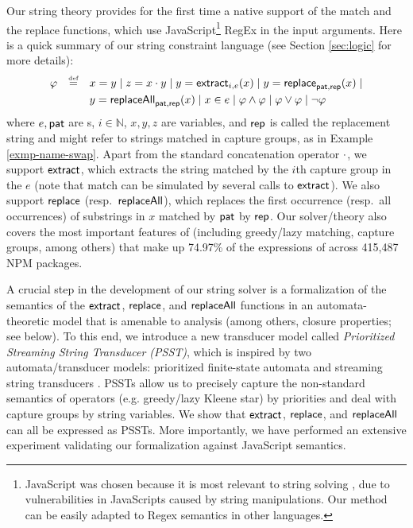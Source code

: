 Our string theory provides for the first time a native support of the match and the 
replace functions, which use JavaScript\footnote{JavaScript was chosen 
because it is most relevant to string solving 
\cite{BEK,Berkeley-JavaScript}, due to vulnerabilities in JavaScripts 
caused by string manipulations. Our method can be easily adapted to Regex
semantics in other languages.} RegEx in the input arguments. Here is a quick
summary of our string constraint language (see Section \ref{sec:logic} for
more details):
\[
\begin{array}{l c l}
\smallskip
\varphi & \eqdef  & x = y \mid z = x \concat y \mid y  = \extract_{i, e}(x) \mid
y  = \replace_{\pat, \rep}(x) \mid 
\\
& & y = \replaceall_{\pat, \rep}(x)   \mid
 x \in e \mid \varphi \wedge \varphi \mid \varphi \vee \varphi \mid \neg \varphi \
\label{eq:SL}
\end{array}
\]
where $e, \mathsf{pat}$ are \regexp{}s, $i \in \mathbb{N}$, $x,y,z$ are variables, and $\mathsf{rep}$ 
is called the
replacement string and might refer to strings matched in capture groups,
as in Example \ref{exmp-name-swap}. Apart from the standard concatenation
operator $\cdot$, we support $\mathsf{extract}$, which extracts the string matched by
the $i$th capture group in the \regexp{} $e$ (note that match can be simulated
by several calls to $\mathsf{extract}$). We also support $\mathsf{replace}$ 
(resp.~$\mathsf{replaceAll}$), which replaces the first occurrence (resp.~all
occurrences) of substrings in $x$ matched by $\mathsf{pat}$ by $\mathsf{rep}$. Our solver/theory
also covers the most important features of \regexp{} (including greedy/lazy
matching, capture groups, among others) that make up 74.97\% of the \regexp{}
expressions of \cite{LMK19} across 415,487 NPM packages. 

A crucial step in the development of our string solver is a formalization of
the semantics of the $\mathsf{extract}$, $\mathsf{replace}$, and $\mathsf{replaceAll}$ functions in
an automata-theoretic model that is amenable to analysis (among others, closure
properties; see below).
%
To this end, we introduce a new 
transducer model called \emph{Prioritized Streaming String Transducer (PSST)},
which is inspired by %
two automata/transducer models: prioritized finite-state automata \cite{BM17} 
and streaming string transducers \cite{AC10,AD11}. PSSTs allow us to precisely
capture the non-standard semantics of \regexp{} operators (e.g. greedy/lazy Kleene star) by priorities and 
deal with capture groups by string variables. 
We show that $\mathsf{extract}$, $\mathsf{replace}$, and $\mathsf{replaceAll}$ can all be expressed as 
PSSTs. More importantly, we have performed an extensive experiment
validating our formalization against JavaScript semantics. 

